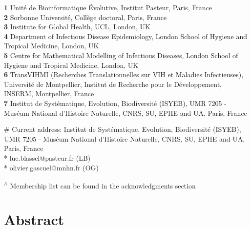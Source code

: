 \documentclass[
  11pt,
  twoside]{scrbook}
\begin{document}
\textbf{1} Unité de Bioinformatique Évolutive, Institut Pasteur, Paris,
France\\
\textbf{2} Sorbonne Université, Collège doctoral, Paris, France\\
\textbf{3} Institute for Global Health, UCL, London, UK\\
\textbf{4} Department of Infectious Disease Epidemiology, London School of
Hygiene and Tropical Medicine, London, UK\\
\textbf{5} Centre for Mathematical Modelling of Infectious Diseases, London
School of Hygiene and Tropical Medicine, London, UK\\
\textbf{6} TransVIHMI (Recherches Translationnelles sur VIH et Maladies
Infectieuses), Université de Montpellier, Institut de Recherche pour le
Développement, INSERM, Montpellier, France\\
\textbf{7} Institut de Systématique, Evolution, Biodiversité (ISYEB), UMR
7205 - Muséum National d'Histoire Naturelle, CNRS, SU, EPHE and UA,
Paris, France

\# Current address: Institut de Systématique, Evolution, Biodiversité
(ISYEB), UMR 7205 - Muséum National d'Histoire Naturelle, CNRS, SU, EPHE
and UA, Paris, France\\
* luc.blassel@pasteur.fr (LB)\\
* olivier.gascuel@mnhn.fr (OG)

\textsuperscript{\(\wedge\)} Membership list can be found in the acknowledgments section

\hypertarget{abstract-paper}{%
\section*{Abstract}\label{abstract-paper}}
\end{document}
